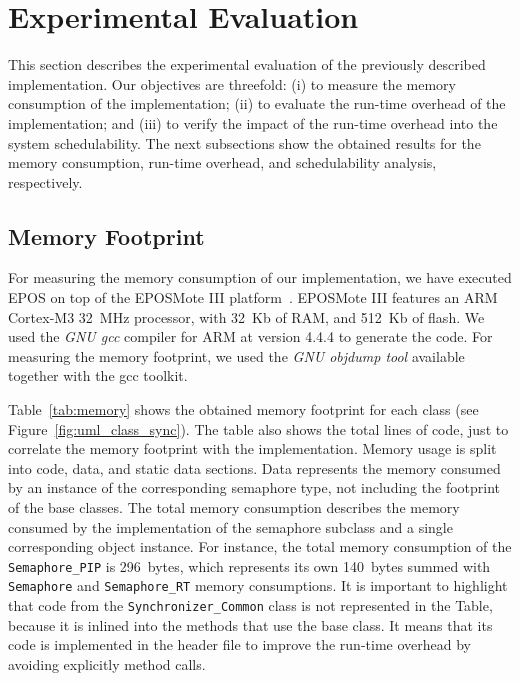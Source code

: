\section{Experimental Evaluation}
\label{sec:eval}

This section describes the experimental evaluation of the previously described 
implementation. Our objectives are threefold: (i) to measure the memory 
consumption of the implementation; (ii) to evaluate the run-time overhead of 
the implementation; and (iii) to verify the impact of the run-time overhead 
into the system schedulability. The next subsections show the obtained results 
for the memory consumption, run-time overhead, and schedulability analysis, 
respectively.

\subsection{Memory Footprint}

For measuring the memory consumption of our implementation, we have executed 
EPOS on top of the EPOSMote III platform~\cite{epos}. EPOSMote III features an 
ARM Cortex-M3 32~MHz processor, with 32~Kb of RAM, and 512~Kb of flash. We used 
the \emph{GNU gcc} compiler for ARM at version 4.4.4 to generate the code. For 
measuring the memory footprint, we used the \emph{GNU objdump tool} available 
together with the gcc toolkit.

Table~\ref{tab:memory} shows the obtained memory footprint for each class (see 
Figure~\ref{fig:uml_class_sync}). The table also shows the total lines of code, 
just to correlate the memory footprint with the implementation. Memory usage is 
split into code, data, and static data sections. Data represents the memory 
consumed by an instance of the corresponding semaphore type, not including the 
footprint of the base classes. The total memory consumption describes the memory 
consumed by the implementation of the semaphore subclass and a single 
corresponding object instance. For instance, the total memory consumption of 
the \texttt{Semaphore\_PIP} is 296~bytes, which represents its own 140~bytes 
summed with \texttt{Semaphore} and \texttt{Semaphore\_RT} memory consumptions. 
It is important to highlight that code from the \texttt{Synchronizer\_Common} 
class is not represented in the Table, because it is inlined into the methods 
that use the base class. It means that its code is implemented in the header 
file to improve the run-time overhead by avoiding explicitly method calls. 

